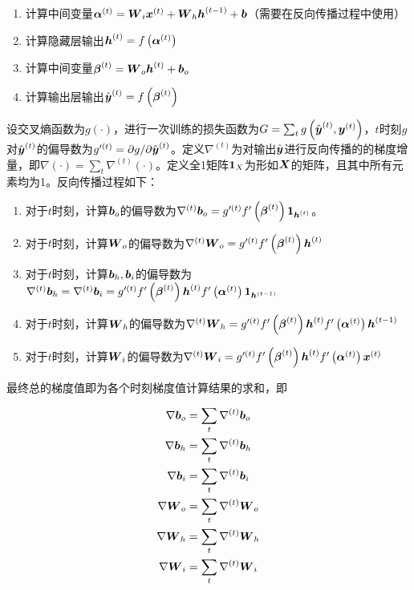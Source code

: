 \documentclass{../notes}
\begin{document}
    \begin{enumerate}[label=\textit{第\arabic*步}]
        \item 计算中间变量$\boldsymbol \alpha^{(t)} = \boldsymbol W_i\boldsymbol x^{(t)} + \boldsymbol W_h\boldsymbol h^{(t-1)} + \boldsymbol b$（需要在反向传播过程中使用）
        \item 计算隐藏层输出$\boldsymbol h^{(t)} = f\left(\boldsymbol \alpha^{(t)}\right)$
        \item 计算中间变量$\boldsymbol \beta^{(t)} = \boldsymbol W_o \boldsymbol h^{(t)} + \boldsymbol b_o$
        \item 计算输出层输出$\hat {\boldsymbol y}^{(t)} = f\left(\boldsymbol \beta^{(t)}\right)$
    \end{enumerate}

    设交叉熵函数为$g(\cdot)$，进行一次训练的损失函数为$G = \sum_{t} g\left(\hat {\boldsymbol y}^{(t)}, \boldsymbol y^{(t)}\right)$，$t$时刻$g$对$\hat {\boldsymbol{y}}^{(t)}$的偏导数为$g'^{(t)} = \partial g/ \partial \hat {\boldsymbol{y}}^{(t)}$。定义$\nabla^{(t)}$为对输出$\hat {\boldsymbol y}$进行反向传播的的梯度增量，即$\nabla (\cdot) = \sum_t \nabla^{(t)} (\cdot)$。定义全1矩阵$\boldsymbol 1_{X}$为形如$\boldsymbol X$的矩阵，且其中所有元素均为1。反向传播过程如下：

    \begin{enumerate}[label=\textit{第\arabic*步}]
        \item 对于$t$时刻，计算$\boldsymbol b_o$的偏导数为$\nabla^{(t)} \boldsymbol b_o = g'^{(t)}f'\left(\boldsymbol \beta^{(t)}\right)\boldsymbol 1_{\boldsymbol h^{(t)}}$。
        \item 对于$t$时刻，计算$\boldsymbol W_o$的偏导数为$\nabla^{(t)} \boldsymbol W_o = g'^{(t)}f'\left(\boldsymbol \beta^{(t)}\right)\boldsymbol h^{(t)}$
        \item 对于$t$时刻，计算$\boldsymbol b_h, \boldsymbol b_i$的偏导数为$\nabla^{(t)} \boldsymbol b_h = \nabla^{(t)} \boldsymbol b_i = g'^{(t)}f'\left(\boldsymbol \beta^{(t)}\right)\boldsymbol h^{(t)} f'\left(\boldsymbol \alpha^{(t)}\right)\boldsymbol 1_{\boldsymbol h^{(t-1)}}$
        \item 对于$t$时刻，计算$\boldsymbol W_h$的偏导数为$\nabla^{(t)} \boldsymbol W_h = g'^{(t)}f'\left(\boldsymbol \beta^{(t)}\right)\boldsymbol h^{(t)}f'\left(\boldsymbol \alpha^{(t)}\right)\boldsymbol h^{(t-1)}$
        \item 对于$t$时刻，计算$\boldsymbol W_i$的偏导数为$\nabla^{(t)} \boldsymbol W_i = g'^{(t)}f'\left(\boldsymbol \beta^{(t)}\right)\boldsymbol h^{(t)}f'\left(\boldsymbol \alpha^{(t)}\right)\boldsymbol x^{(t)}$
    \end{enumerate}

    最终总的梯度值即为各个时刻梯度值计算结果的求和，即

    \begin{equation}
        \begin{aligned}
            \nabla \boldsymbol b_{o} &= \sum_{t}\nabla^{(t)} \boldsymbol b_o \\
            \nabla \boldsymbol b_{h} &= \sum_{t}\nabla^{(t)} \boldsymbol b_h \\
            \nabla \boldsymbol b_{i} &= \sum_{t}\nabla^{(t)} \boldsymbol b_i \\
            \nabla \boldsymbol W_{o} &= \sum_{t}\nabla^{(t)} \boldsymbol W_o \\
            \nabla \boldsymbol W_{h} &= \sum_{t}\nabla^{(t)} \boldsymbol W_h \\
            \nabla \boldsymbol W_{i} &= \sum_{t}\nabla^{(t)} \boldsymbol W_i \\
        \end{aligned}
    \end{equation}
\end{document}
